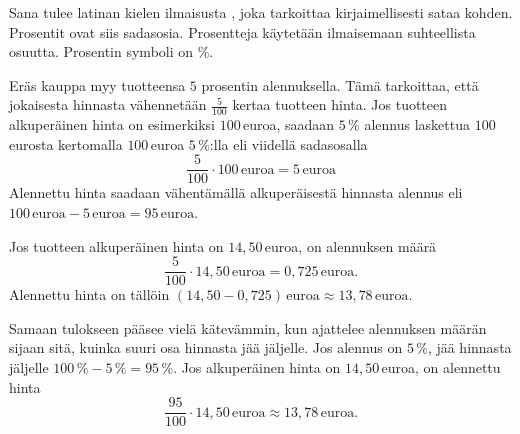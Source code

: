 Sana  tulee latinan kielen ilmaisusta , joka tarkoittaa kirjaimellisesti sataa kohden. Prosentit ovat siis sadasosia. Prosentteja käytetään ilmaisemaan suhteellista osuutta. Prosentin symboli on \%.


\begin{esimerkki}

\begin{esimratk}
\end{esimratk}
\end{esimerkki}

\begin{esimerkki}
Eräs kauppa myy tuotteensa $5$ prosentin alennuksella. Tämä tarkoittaa, että jokaisesta hinnasta vähennetään $\frac{5}{100}$ kertaa tuotteen hinta. Jos tuotteen alkuperäinen hinta on esimerkiksi $100$\,euroa, saadaan $5\,\%$ alennus laskettua $100$\,eurosta kertomalla $100$\,euroa $5\,\%$:lla eli viidellä sadasosalla 
\[
\frac{5}{100} \cdot 100\,\text{euroa} = 5\,\text{euroa}
\]
Alennettu hinta saadaan vähentämällä alkuperäisestä hinnasta alennus eli $100\,\text{euroa} - 5\,\text{euroa} = 95\,\text{euroa}$.

Jos tuotteen alkuperäinen hinta on $14,50$\,euroa, on alennuksen määrä
\[
	\frac{5}{100} \cdot 14,50\,\text{euroa} = 0,725\,\text{euroa}.
\]
Alennettu hinta on tällöin $(14,50 - 0,725)\,\text{euroa} \approx 13,78\,\text{euroa}$.

Samaan tulokseen pääsee vielä kätevämmin, kun ajattelee alennuksen määrän sijaan sitä, kuinka suuri osa hinnasta jää jäljelle. Jos alennus on $5\,\%$, jää hinnasta jäljelle $100\,\% - 5\,\% = 95\,\%$. Jos alkuperäinen hinta on $14,50$\,euroa, on alennettu hinta 
\[
	\frac{95}{100} \cdot 14,50\,\text{euroa} \approx 13,78\,\text{euroa}.
\]
\end{esimerkki}

